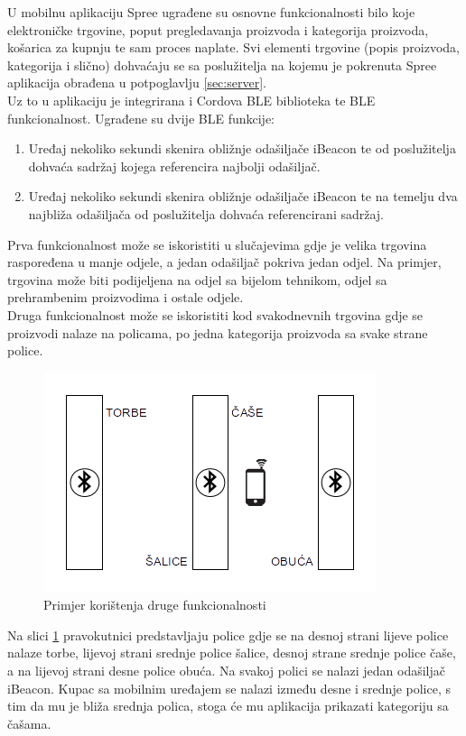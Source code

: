 U mobilnu aplikaciju Spree ugrađene su osnovne funkcionalnosti bilo koje elektroničke trgovine, poput pregledavanja proizvoda i kategorija proizvoda, košarica za kupnju te sam proces naplate. 
Svi elementi trgovine (popis proizvoda, kategorija i slično) dohvaćaju se sa poslužitelja na kojemu je pokrenuta Spree aplikacija obrađena u potpoglavlju \ref{sec:server}.
\\
Uz to u aplikaciju je integrirana i Cordova BLE biblioteka te BLE funkcionalnost.
Ugrađene su dvije BLE funkcije:
\begin{enumerate}
    \item Uređaj nekoliko sekundi skenira obližnje odašiljače iBeacon te od poslužitelja dohvaća sadržaj kojega referencira najbolji odašiljač.
    \item Uređaj nekoliko sekundi skenira obližnje odašiljače iBeacon te na temelju dva najbliža odašiljača od poslužitelja dohvaća referencirani sadržaj.
\end{enumerate}

Prva funkcionalnost može se iskoristiti u slučajevima gdje je velika trgovina raspoređena u manje odjele, a jedan odašiljač pokriva jedan odjel. 
Na primjer, trgovina može biti podijeljena na odjel sa bijelom tehnikom, odjel sa prehrambenim proizvodima i ostale odjele. 
\\
Druga funkcionalnost može se iskoristiti kod svakodnevnih trgovina gdje se proizvodi nalaze na policama, po jedna kategorija proizvoda sa svake strane police.

\begin{figure}[H]
    \centering
    \includegraphics[scale=0.85]{pictures/BLE-funkcionalnost}
    \caption{Primjer korištenja druge funkcionalnosti}
    \label{pic:bleShop}
\end{figure}
Na slici \ref{pic:bleShop} pravokutnici predstavljaju police gdje se na desnoj strani lijeve police nalaze torbe, lijevoj strani srednje police šalice, desnoj strane srednje police čaše, a na lijevoj strani desne police obuća. 
Na svakoj polici se nalazi jedan odašiljač iBeacon. 
Kupac sa mobilnim uređajem se nalazi između desne i srednje police, s tim da mu je bliža srednja polica, stoga će mu aplikacija prikazati kategoriju sa čašama.
\\

